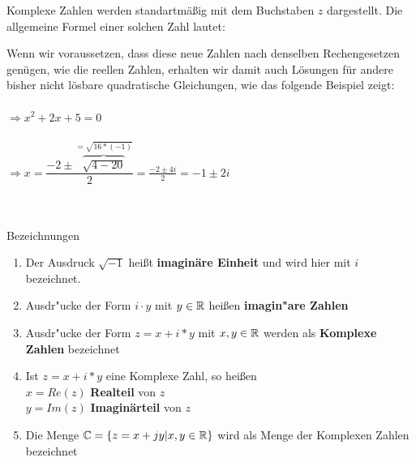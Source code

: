 	\begin{Definition}
		Komplexe Zahlen werden standartmäßig mit dem Buchstaben $z$ dargestellt. Die allgemeine Formel einer solchen Zahl lautet:
		\\
	\end{Definition}

	Wenn wir voraussetzen, dass diese neue Zahlen nach denselben Rechengesetzen genügen, wie die reellen Zahlen, erhalten wir damit auch Lösungen für andere bisher nicht lösbare quadratische Gleichungen, wie das folgende Beispiel zeigt:\\
	\\
	$\Rightarrow x^2 + 2x + 5 = 0$\\
	\\
	$\Rightarrow x = \dfrac { -2± \overbrace{ \sqrt{4-20}}^{=\sqrt{16*(-1)}} } { 2}
	=\frac {-2 ±4i}{2}
	= -1±2i$\\
	\\
	\\
	\begin{Bemerkung}
	Bezeichnungen\\
	\end{Bemerkung}

	\begin{enumerate}
	\item Der Ausdruck $\sqrt{-1}$ heißt \textbf{imaginäre Einheit} und wird hier mit $i$ bezeichnet.
	\item Ausdr"ucke der Form $i\cdot y$ mit $y \in \mathbb{R}$  heißen \textbf{imagin"are Zahlen}
	\item Ausdr"ucke der Form $z =x+i*y$ mit $x,y \in \mathbb{R}$ werden als \textbf{Komplexe Zahlen} bezeichnet
	\item Ist $z =x+i*y$ eine Komplexe Zahl, so heißen\\
	\indent $x=Re(z)$ \textbf{Realteil} von $z$\\
	\indent $y=Im(z)$ \textbf{Imaginärteil} von $z$
	\item Die Menge $\mathbb{C} =\{ {z = x+j y| x, y \in \mathbb{R}}\}$ wird als Menge der Komplexen Zahlen bezeichnet\\
	\end{enumerate}

